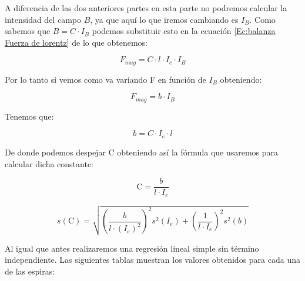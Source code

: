 \documentclass[12pt,a4paper]{book}
\begin{document}
A diferencia de las dos anteriores partes en esta parte no podremos calcular la intensidad del campo $B$, ya que aquí lo que iremos cambiando es $I_B$. Como sabemos que $B=C \cdot I_B$ podemos substituir esto en la ecuación \ref{Ec:balanza Fuerza de lorentz} de lo que obtenemos:

$$ F_{mag}=C \cdot l \cdot I_e \cdot I_B $$

Por lo tanto si vemos como va variando F en función de $I_B$ obteniendo:

$$ F_{mag}=b \cdot I_B$$

Tenemos que:

$$ b = C \cdot I_e \cdot l$$ 

De donde podemos despejar C obteniendo así la fórmula que usaremos para calcular dicha constante:

\begin{equation}
\mathrm{C}=\dfrac{b}{l \cdot I_e}
\label{Ec: valor de cte con Ib constante balanza electrodinamica}
\end{equation}


\begin{equation}
s(\mathrm{C})=\sqrt{(\dfrac{b}{l \cdot (I_e)^2})^2s^2(I_e)+(\dfrac{1}{l \cdot I_e})^2s^2(b)}
\label{Ec: incertidumbre de cte con Ib constante balanza electrodnamica}
\end{equation}

Al igual que antes realizaremos una regresión lineal simple sin término independiente. Las siguientes tablas muestran los valores obtenidos para cada una de las espiras: 

\newpage

\vspace*{2.5cm}
\end{document}
